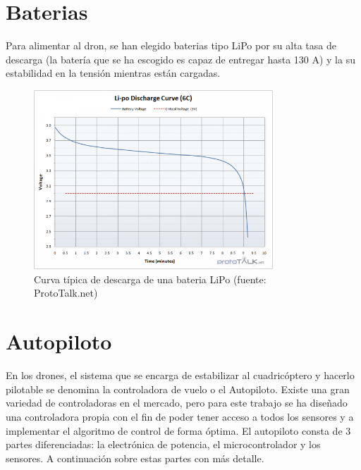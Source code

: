 \section{Baterias}
Para alimentar al dron, se han elegido baterias tipo LiPo por su alta tasa de descarga (la batería que se ha escogido es capaz de entregar hasta 130 A) y la su estabilidad en la tensión mientras están cargadas.


\begin{figure}[htb!]
		\centering
		\includegraphics[width=0.8\textwidth]{hardware/curvaLipo}
		\caption{Curva típica de descarga de una bateria LiPo (fuente: ProtoTalk.net)}
		\label{hardware:curvaLipo}

\end{figure}


\section{Autopiloto}

En los drones, el sistema que se encarga de estabilizar al cuadricóptero y hacerlo pilotable se denomina la controladora de vuelo o el Autopiloto. Existe una gran variedad de controladoras en el mercado, pero para este trabajo se ha diseñado una controladora propia con el fin de poder tener acceso a todos los sensores y a implementar el algoritmo de control de forma óptima. El autopiloto consta de 3 partes diferenciadas: la electrónica de potencia, el microcontrolador y los sensores. A continuación  sobre estas partes con más detalle.\\


\\

